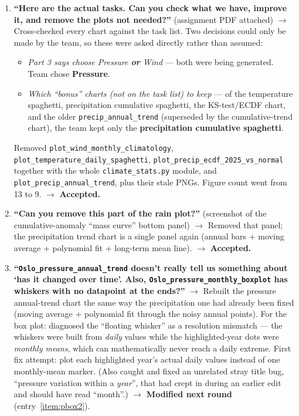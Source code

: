 \begin{enumerate}[leftmargin=*, itemsep=0.8em]
\item \label{item:cleanup} \textbf{``Here are the actual tasks. Can you check what we have,
improve it, and remove the plots not needed?''} (assignment PDF attached)
$\rightarrow$ Cross-checked every chart against the task list. Two decisions could only be
made by the team, so these were asked directly rather than assumed:
\begin{itemize}[leftmargin=*]
\item \emph{Part 3 says choose Pressure \textbf{or} Wind} --- both were being generated.
Team chose \textbf{Pressure}.
\item \emph{Which ``bonus'' charts (not on the task list) to keep} --- of the temperature
spaghetti, precipitation cumulative spaghetti, the KS-test/ECDF chart, and the older
\texttt{precip\_annual\_trend} (superseded by the cumulative-trend chart), the team kept only
the \textbf{precipitation cumulative spaghetti}.
\end{itemize}
Removed \texttt{plot\_wind\_monthly\_climatology},
\texttt{plot\_temperature\_daily\_spaghetti},
\texttt{plot\_precip\_ecdf\_2025\_vs\_normal} together with the whole
\texttt{climate\_stats.py} module, and \texttt{plot\_precip\_annual\_trend}, plus their stale
PNGs. Figure count went from 13 to 9.
$\rightarrow$ \textbf{Accepted.}

\item \label{item:masscurve} \textbf{``Can you remove this part of the rain plot?''}
(screenshot of the cumulative-anomaly ``mass curve'' bottom panel)
$\rightarrow$ Removed that panel; the precipitation trend chart is a single panel again
(annual bars + moving average + polynomial fit + long-term mean line).
$\rightarrow$ \textbf{Accepted.}

\item \label{item:pbox1} \textbf{``\texttt{Oslo\_pressure\_annual\_trend} doesn't really tell
us something about `has it changed over time'. Also,
\texttt{Oslo\_pressure\_monthly\_boxplot} has whiskers with no datapoint at the ends?''}
$\rightarrow$ Rebuilt the pressure annual-trend chart the same way the precipitation one had
already been fixed (moving average + polynomial fit through the noisy annual points). For the
box plot: diagnosed the ``floating whisker'' as a resolution mismatch --- the whiskers were
built from \emph{daily} values while the highlighted-year dots were \emph{monthly means},
which can mathematically never reach a daily extreme. First fix attempt: plot each
highlighted year's actual daily values instead of one monthly-mean marker. (Also caught and
fixed an unrelated stray title bug, ``pressure variation within a \emph{year}'', that had crept
in during an earlier edit and should have read ``month''.)
$\rightarrow$ \textbf{Modified next round} (entry~\ref{item:pbox2}).


\end{enumerate}
